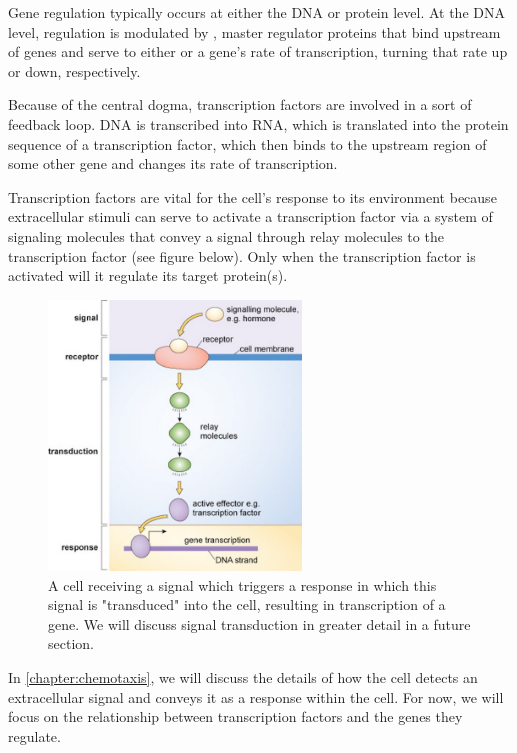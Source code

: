 Gene regulation typically occurs at either the DNA or protein level. At the DNA level, regulation is modulated by , master regulator proteins that bind upstream of genes and serve to either  or  a gene's rate of transcription, turning that rate up or down, respectively.

Because of the central dogma, transcription factors are involved in a sort of feedback loop. DNA is transcribed into RNA, which is translated into the protein sequence of a transcription factor, which then binds to the upstream region of some other gene and changes its rate of transcription.

Transcription factors are vital for the cell's response to its environment because extracellular stimuli can serve to activate a transcription factor via a system of signaling molecules that convey a signal through relay molecules to the transcription factor (see figure below). Only when the transcription factor is activated will it regulate its target protein(s).

\begin{figure}[h]
\centering
\mySfFamily
\includegraphics[width = 0.6\textwidth]{../assets/images/600px/signal_pathway.jpg}
\caption{A cell receiving a signal which triggers a response in which this signal is "transduced" into the cell, resulting in transcription of a gene. We will discuss signal transduction in greater detail in a future section.}
\label{fig:genetic_code}
\end{figure}

In \autoref{chapter:chemotaxis}, we will discuss the details of how the cell detects an extracellular signal and conveys it as a response within the cell. For now, we will focus on the relationship between transcription factors and the genes they regulate.

